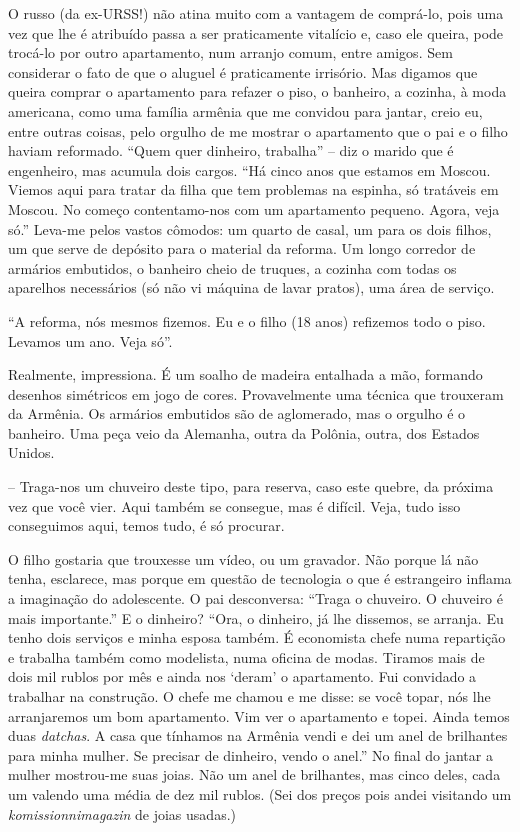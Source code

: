 O russo (da ex-URSS!) não atina muito com a vantagem de comprá-lo, pois
uma vez que lhe é atribuído passa a ser praticamente vitalício e, caso
ele queira, pode trocá-lo por outro apartamento, num arranjo comum,
entre amigos. Sem considerar o fato de que o aluguel é praticamente
irrisório. Mas digamos que queira comprar o apartamento para refazer o
piso, o banheiro, a cozinha, à moda americana, como uma família armênia
que me convidou para jantar, creio eu, entre outras coisas, pelo orgulho
de me mostrar o apartamento que o pai e o filho haviam reformado. ``Quem
quer dinheiro, trabalha'' -- diz o marido que é engenheiro, mas acumula
dois cargos. ``Há cinco anos que estamos em Moscou. Viemos aqui para
tratar da filha que tem problemas na espinha, só tratáveis em Moscou. No
começo contentamo-nos com um apartamento pequeno. Agora, veja só.''
Leva-me pelos vastos cômodos: um quarto de casal, um para os dois
filhos, um que serve de depósito para o material da reforma. Um longo
corredor de armários embutidos, o banheiro cheio de truques, a cozinha
com todas os aparelhos necessários (só não vi máquina de lavar pratos),
uma área de serviço.

``A reforma, nós mesmos fizemos. Eu e o filho (18 anos) refizemos todo o
piso. Levamos um ano. Veja só''.

Realmente, impressiona. É um soalho de madeira entalhada a mão, formando
desenhos simétricos em jogo de cores. Provavelmente uma técnica que
trouxeram da Armênia. Os armários embutidos são de aglomerado, mas o
orgulho é o banheiro. Uma peça veio da Alemanha, outra da Polônia,
outra, dos Estados Unidos.

-- Traga-nos um chuveiro deste tipo, para reserva, caso este quebre, da
próxima vez que você vier. Aqui também se consegue, mas é difícil. Veja,
tudo isso conseguimos aqui, temos tudo, é só procurar.

O filho gostaria que trouxesse um vídeo, ou um gravador. Não porque lá
não tenha, esclarece, mas porque em questão de tecnologia o que é
estrangeiro inflama a imaginação do adolescente. O pai desconversa:
``Traga o chuveiro. O chuveiro é mais importante.'' E o dinheiro? ``Ora,
o dinheiro, já lhe dissemos, se arranja. Eu tenho dois serviços e minha
esposa também. É economista chefe numa repartição e trabalha também como
modelista, numa oficina de modas. Tiramos mais de dois mil rublos por
mês e ainda nos `deram' o apartamento. Fui convidado a trabalhar na
construção. O chefe me chamou e me disse: se você topar, nós lhe
arranjaremos um bom apartamento. Vim ver o apartamento e topei. Ainda
temos duas \emph{datchas}. A casa que tínhamos na Armênia vendi e dei um
anel de brilhantes para minha mulher. Se precisar de dinheiro, vendo o
anel.'' No final do jantar a mulher mostrou-me suas joias. Não um anel
de brilhantes, mas cinco deles, cada um valendo uma média de dez mil
rublos. (Sei dos preços pois andei visitando um
\emph{komissionnimagazin} de joias usadas.)

